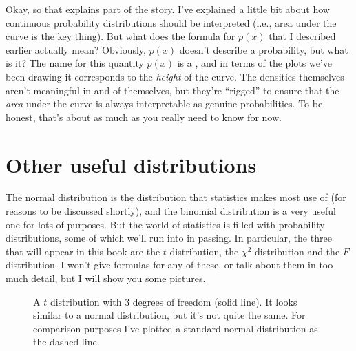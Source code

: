 Okay, so that explains part of the story. I've explained a little bit about how continuous probability distributions should be interpreted (i.e., area under the curve is the key thing). But what does the formula for $p(x)$ that I described earlier actually mean? Obviously, $p(x)$ doesn't describe a probability, but what is it? The name for this quantity $p(x)$ is a , and in terms of the plots we've been drawing it corresponds to the {\it height} of the curve. The densities themselves aren't meaningful in and of themselves, but they're ``rigged'' to ensure that the {\it area} under the curve is always interpretable as genuine probabilities. To be honest, that's about as much as you really need to know for now.


\section{Other useful distributions~\label{sec:otherdists}}

The normal distribution is the distribution that statistics makes most use of (for reasons to be discussed shortly), and the binomial distribution is a very useful one for lots of purposes. But the world of statistics is filled with probability distributions, some of which we'll run into in passing. In particular, the three that will appear in this book are the $t$ distribution, the $\chi^2$ distribution and the $F$ distribution. I won't give formulas for any of these, or talk about them in too much detail, but I will show you some pictures. 

\begin{figure}[!!h]
\begin{center}
\caption{A $t$ distribution with 3 degrees of freedom (solid line). It looks similar to a normal distribution, but it's not quite the same. For comparison purposes I've plotted a standard normal distribution as the dashed line.}
\label{fig:tdist}
\HR
\end{center}
\end{figure}

